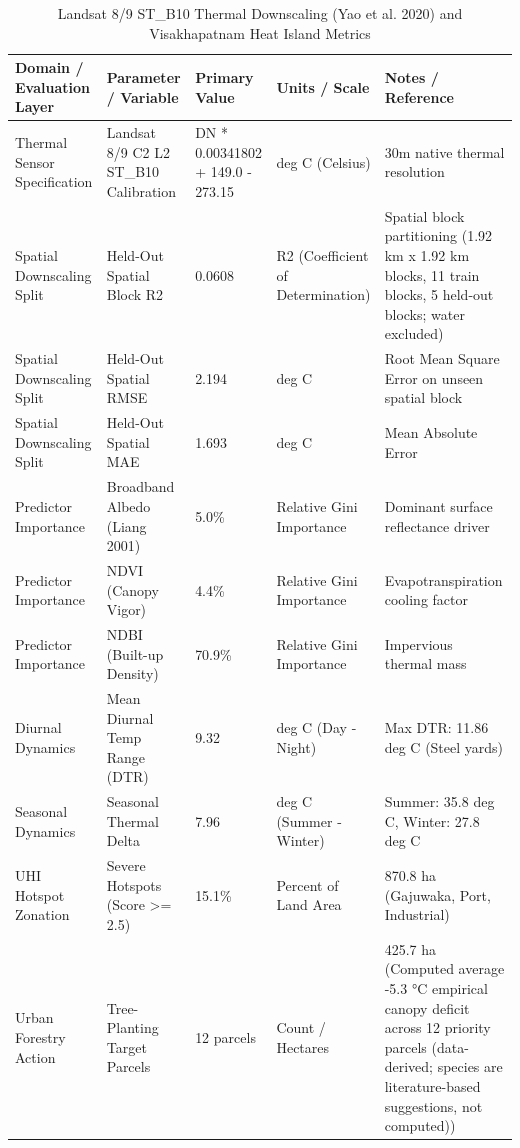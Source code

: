 \begin{table}[htbp]
\centering
\caption{Landsat 8/9 ST\_B10 Thermal Downscaling (Yao et al. 2020) and Visakhapatnam Heat Island Metrics}
\label{tab:heat_metrics}
\begin{tabular}{lllll}
\hline
\textbf{Domain / Evaluation Layer} & \textbf{Parameter / Variable} & \textbf{Primary Value} & \textbf{Units / Scale} & \textbf{Notes / Reference} \\
\hline
Thermal Sensor Specification & Landsat 8/9 C2 L2 ST\_B10 Calibration & DN * 0.00341802 + 149.0 - 273.15 & deg C (Celsius) & 30m native thermal resolution \\
Spatial Downscaling Split & Held-Out Spatial Block R2 & 0.0608 & R2 (Coefficient of Determination) & Spatial block partitioning (1.92 km x 1.92 km blocks, 11 train blocks, 5 held-out blocks; water excluded) \\
Spatial Downscaling Split & Held-Out Spatial RMSE & 2.194 & deg C & Root Mean Square Error on unseen spatial block \\
Spatial Downscaling Split & Held-Out Spatial MAE & 1.693 & deg C & Mean Absolute Error \\
Predictor Importance & Broadband Albedo (Liang 2001) & 5.0\% & Relative Gini Importance & Dominant surface reflectance driver \\
Predictor Importance & NDVI (Canopy Vigor) & 4.4\% & Relative Gini Importance & Evapotranspiration cooling factor \\
Predictor Importance & NDBI (Built-up Density) & 70.9\% & Relative Gini Importance & Impervious thermal mass \\
Diurnal Dynamics & Mean Diurnal Temp Range (DTR) & 9.32 & deg C (Day - Night) & Max DTR: 11.86 deg C (Steel yards) \\
Seasonal Dynamics & Seasonal Thermal Delta & 7.96 & deg C (Summer - Winter) & Summer: 35.8 deg C, Winter: 27.8 deg C \\
UHI Hotspot Zonation & Severe Hotspots (Score >= 2.5) & 15.1\% & Percent of Land Area & 870.8 ha (Gajuwaka, Port, Industrial) \\
Urban Forestry Action & Tree-Planting Target Parcels & 12 parcels & Count / Hectares & 425.7 ha (Computed average -5.3 °C empirical canopy deficit across 12 priority parcels (data-derived; species are literature-based suggestions, not computed)) \\
\hline
\end{tabular}
\end{table}